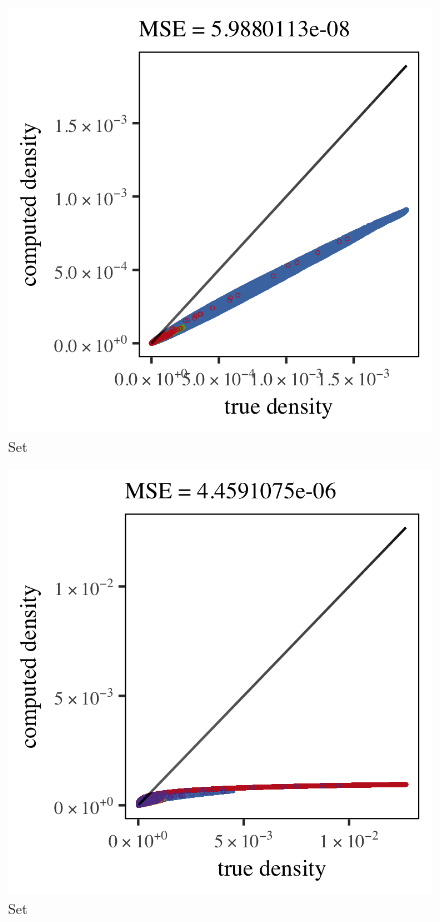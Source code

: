 \begin{subfigure}{0.3\textwidth}
	\centering
	\includegraphics[keepaspectratio=true, width=\textwidth, height=0.23\textheight]{4/img/results_baakman_2_600000_mbe_breiman}
	\caption{Set \baakmanTwo}
	\label{fig:4:simulated:datasets:mbe:baakman2}
\end{subfigure}	
\begin{subfigure}{0.3\textwidth}
	\centering
	\includegraphics[keepaspectratio=true, width=\textwidth, height=0.23\textheight]{4/img/results_baakman_3_1200000_mbe_breiman}
	\caption{Set \baakmanThree}
	\label{fig:4:simulated:datasets:mbe:baakman3}
\end{subfigure}				
